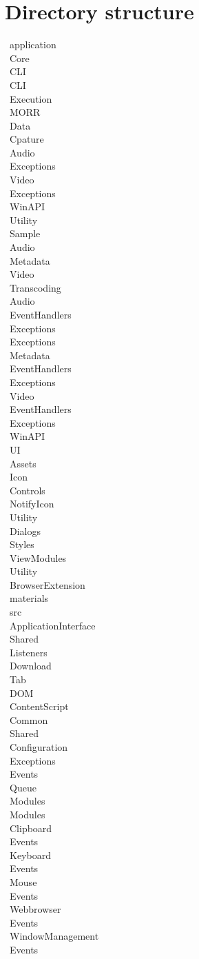 \chapter{Directory structure}
\label{ch:dirstructure}
\newcommand{\tab}[1][1cm]{\hspace*{#1}}
\newcommand{\dir}[2]{\tab[#1cm] \textbullet \ #2 \\}

\begin{multicols}{2}
\dir{0}{application}
    \dir{0.5}{Core}
        \dir{1}{CLI}
            \dir{1.5}{CLI}
                \dir{2}{Execution}
        \dir{1}{MORR}
            \dir{1.5}{Data}
                \dir{2}{Cpature}
                    \dir{2.5}{Audio}
                        \dir{3}{Exceptions}
                    \dir{2.5}{Video}
                        \dir{3}{Exceptions}
                            \dir{3.5}{WinAPI}
                                \dir{4}{Utility}
                \dir{2}{Sample}
                    \dir{2.5}{Audio}
                    \dir{2.5}{Metadata}
                    \dir{2.5}{Video}
                \dir{2}{Transcoding}
                    \dir{2.5}{Audio}
                        \dir{3}{EventHandlers}
                        \dir{3}{Exceptions}
                    \dir{2.5}{Exceptions}
                    \dir{2.5}{Metadata}
                        \dir{3}{EventHandlers}
                        \dir{3}{Exceptions}
                    \dir{2.5}{Video}
                        \dir{3}{EventHandlers}
                        \dir{3}{Exceptions}
                    \dir{2.5}{WinAPI}
        \dir{1}{UI}
            \dir{1.5}{Assets}
                \dir{2}{Icon}
            \dir{1.5}{Controls}
                \dir{2}{NotifyIcon}
                \dir{2}{Utility}
            \dir{1.5}{Dialogs}
            \dir{1.5}{Styles}
            \dir{1.5}{ViewModules}
                \dir{2}{Utility}
    \dir{0.5}{BrowserExtension}
        \dir{1}{materials}
        \dir{1}{src}
            \dir{1.5}{ApplicationInterface}
            \dir{1.5}{Shared}
            \dir{1.5}{Listeners}
                \dir{2}{Download}
                \dir{2}{Tab}
                \dir{2}{DOM}
                    \dir{2.5}{ContentScript}
    \dir{0.5}{Common}
        \dir{1}{Shared}
            \dir{1.5}{Configuration}
                \dir{2}{Exceptions}
            \dir{1.5}{Events}
                \dir{2}{Queue}
            \dir{1.5}{Modules}
    \dir{0.5}{Modules}
        \dir{1}{Clipboard}
            \dir{1.5}{Events}
        \dir{1}{Keyboard}
            \dir{1.5}{Events}
        \dir{1}{Mouse}
            \dir{1.5}{Events}
        \dir{1}{Webbrowser}
            \dir{1.5}{Events}
        \dir{1}{WindowManagement}
            \dir{1.5}{Events}
\end{multicols}
